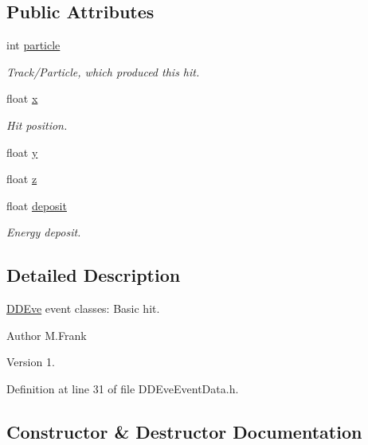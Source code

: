 \subsection*{Public Attributes}
\begin{DoxyCompactItemize}
\item 
int \hyperlink{class_d_d4hep_1_1_d_d_eve_hit_a35b41dfc3b314771711c4b35ba1145f5}{particle}
\begin{DoxyCompactList}\small\item\em Track/\+Particle, which produced this hit. \end{DoxyCompactList}\item 
float \hyperlink{class_d_d4hep_1_1_d_d_eve_hit_aa43de1b526423ff9a1dd54ac140b6941}{x}
\begin{DoxyCompactList}\small\item\em Hit position. \end{DoxyCompactList}\item 
float \hyperlink{class_d_d4hep_1_1_d_d_eve_hit_a4eb2c75de026adb1bc8d73267c8a3fb4}{y}
\item 
float \hyperlink{class_d_d4hep_1_1_d_d_eve_hit_affe739f66c56ced8a7d79b5c736f3b21}{z}
\item 
float \hyperlink{class_d_d4hep_1_1_d_d_eve_hit_ad45cf3f4b4496c2b6db9de03ce77b4a6}{deposit}
\begin{DoxyCompactList}\small\item\em Energy deposit. \end{DoxyCompactList}\end{DoxyCompactItemize}


\subsection{Detailed Description}
\hyperlink{struct_d_d4hep_1_1_d_d_eve}{D\+D\+Eve} event classes\+: Basic hit. 

\begin{DoxyAuthor}{Author}
M.\+Frank 
\end{DoxyAuthor}
\begin{DoxyVersion}{Version}
1. 
\end{DoxyVersion}


Definition at line 31 of file D\+D\+Eve\+Event\+Data.\+h.



\subsection{Constructor \& Destructor Documentation}
\hypertarget{class_d_d4hep_1_1_d_d_eve_hit_a29f91ae5157d9d45c12b233b9a70cd98}{}\label{class_d_d4hep_1_1_d_d_eve_hit_a29f91ae5157d9d45c12b233b9a70cd98} 
